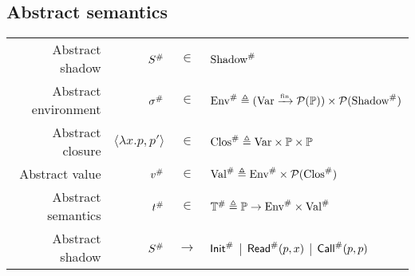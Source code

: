 \subsection{Abstract semantics}
\begin{center}
  \begin{tabular}{rrcl}
    Abstract shadow      & ${S}^{\#}$                 & $\in$         & ${\text{Shadow}}^{\#}$                                                                     \\
    Abstract environment & ${\sigma}^{\#}$                   & $\in$         & ${\text{Env}}^{\#}\triangleq({\text{Var}}\xrightarrow{\mbox{\tiny{fin}}}{\mathcal{P}({\mathbb{P})})}\times\mathcal{P}({{\text{Shadow}}^{\#}})$ \\
    Abstract closure     & $\langle\lambda x.p,p'\rangle$ & $\in$         & ${\text{Clos}}^{\#}\triangleq\text{Var}\times\mathbb{P}\times\mathbb{P}$              \\
    Abstract value       & ${v}^{\#}$                      & $\in$         & ${\text{Val}}^{\#}\triangleq{\text{Env}}^{\#}\times\mathcal{P}({{\text{Clos}}^{\#}})$                   \\
    Abstract semantics   & ${t}^{\#}$                   & $\in$         & ${\mathbb{T}}^{\#}\triangleq\mathbb{P}\rightarrow{\text{Env}}^{\#}\times{\text{Val}}^{\#}$      \\
    Abstract shadow      & ${S}^{\#}$                 & $\rightarrow$ & ${\textsf{Init}}^{\#}$ | ${\textsf{Read}}^{\#}(p,x)$ | ${\textsf{Call}}^{\#}(p,p)$
  \end{tabular}
\end{center}
